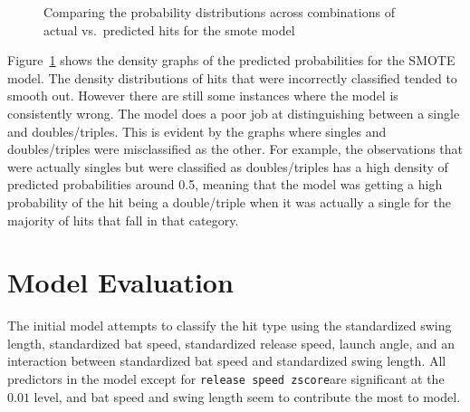 \documentclass[
  letterpaper,
  DIV=11,
  numbers=noendperiod]{scrartcl}
\begin{document}
\begin{figure}[H]


\caption{\label{fig-pred-den-smote}Comparing the probability
distributions across combinations of actual vs.~predicted hits for the
smote model}

\end{figure}%

Figure~\ref{fig-pred-den-smote} shows the density graphs of the
predicted probabilities for the SMOTE model. The density distributions
of hits that were incorrectly classified tended to smooth out. However
there are still some instances where the model is consistently wrong.
The model does a poor job at distinguishing between a single and
doubles/triples. This is evident by the graphs where singles and
doubles/triples were misclassified as the other. For example, the
observations that were actually singles but were classified as
doubles/triples has a high density of predicted probabilities around
0.5, meaning that the model was getting a high probability of the hit
being a double/triple when it was actually a single for the majority of
hits that fall in that category.

\section{Model Evaluation}\label{model-evaluation}

The initial model attempts to classify the hit type using the
standardized swing length, standardized bat speed, standardized release
speed, launch angle, and an interaction between standardized bat speed
and standardized swing length. All predictors in the model except for
\texttt{release\ speed\ zscore}are significant at the \(0.01\) level,
and bat speed and swing length seem to contribute the most to model.
\end{document}
